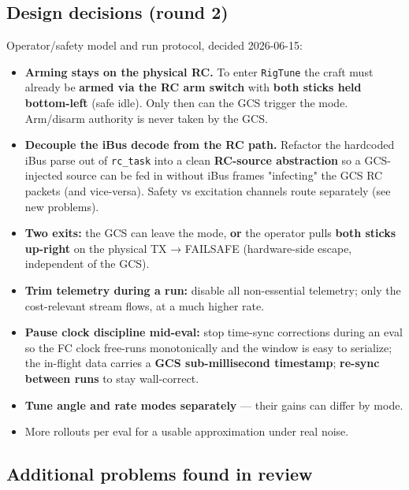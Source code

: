 \documentclass[
  11pt,
]{article}
\providecommand{\tightlist}{%
  \setlength{\itemsep}{0pt}\setlength{\parskip}{0pt}}
\begin{document}
\hypertarget{design-decisions-round-2}{%
\subsection{Design decisions (round 2)}\label{design-decisions-round-2}}

Operator/safety model and run protocol, decided 2026-06-15:

\begin{itemize}
\tightlist
\item
  \textbf{Arming stays on the physical RC.} To enter \texttt{RigTune}
  the craft must already be \textbf{armed via the RC arm switch} with
  \textbf{both sticks held bottom-left} (safe idle). Only then can the
  GCS trigger the mode. Arm/disarm authority is never taken by the GCS.
\item
  \textbf{Decouple the iBus decode from the RC path.} Refactor the
  hardcoded iBus parse out of \texttt{rc\_task} into a clean
  \textbf{RC-source abstraction} so a GCS-injected source can be fed in
  without iBus frames "infecting" the GCS RC packets (and vice-versa).
  Safety vs excitation channels route separately (see new problems).
\item
  \textbf{Two exits:} the GCS can leave the mode, \textbf{or} the
  operator pulls \textbf{both sticks up-right} on the physical TX →
  FAILSAFE (hardware-side escape, independent of the GCS).
\item
  \textbf{Trim telemetry during a run:} disable all non-essential
  telemetry; only the cost-relevant stream flows, at a much higher rate.
\item
  \textbf{Pause clock discipline mid-eval:} stop time-sync corrections
  during an eval so the FC clock free-runs monotonically and the window
  is easy to serialize; the in-flight data carries a \textbf{GCS
  sub-millisecond timestamp}; \textbf{re-sync between runs} to stay
  wall-correct.
\item
  \textbf{Tune angle and rate modes separately} --- their gains can
  differ by mode.
\item
  More rollouts per eval for a usable approximation under real noise.
\end{itemize}

\hypertarget{additional-problems-found-in-review}{%
\subsection{Additional problems found in
review}\label{additional-problems-found-in-review}}
\end{document}
